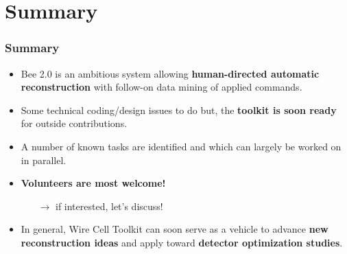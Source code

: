 \documentclass[xcolor=dvipsnames]{beamer}
\begin{document}
\section{Summary}

\begin{frame}
\end{frame}

\begin{frame}
  \frametitle{Summary}
  \begin{itemize}
  \item Bee 2.0 is an ambitious system allowing \textbf{human-directed automatic reconstruction} with follow-on data mining of applied commands.
  \item Some technical coding/design issues to do but, the \textbf{toolkit is soon ready} for outside contributions.
  \item A number of known tasks are identified and which can largely be worked on in parallel.
  \item \textbf{Volunteers are most welcome!}
    \begin{itemize}
    \item[$\rightarrow$] if interested, let's discuss!
    \end{itemize}
  \item In general, Wire Cell Toolkit can soon serve as a vehicle to
    advance \textbf{new reconstruction ideas} and apply toward \textbf{detector optimization studies}.
  \end{itemize}
\end{frame}
\end{document}
